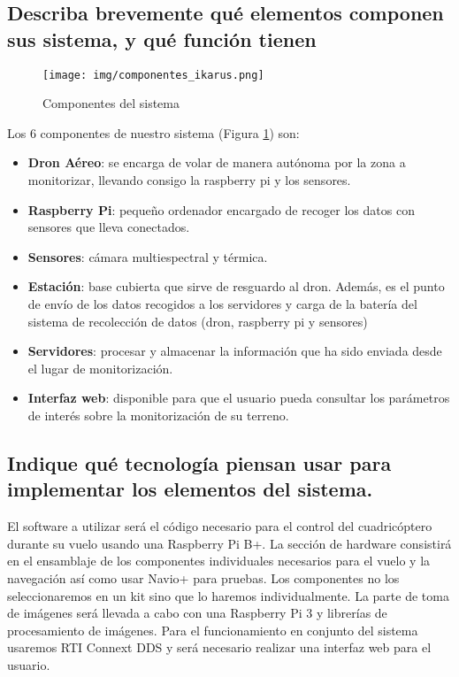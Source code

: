 \documentclass[11pt,spanish]{article} %
\begin{document}
\subsection{Describa brevemente qué elementos componen sus sistema, y qué función tienen}

\begin{figure}[H]
	\centering
	\texttt{[image: img/componentes\_ikarus.png]}
	\caption{Componentes del sistema}
	\label{fig:esquema_inicial}
\end{figure}

Los 6 componentes de nuestro sistema (Figura \ref{fig:esquema_inicial}) son:
\begin{itemize}
\item \textbf{Dron Aéreo}: se encarga de volar de manera autónoma por la zona a monitorizar, llevando consigo la raspberry pi y los sensores.

\item \textbf{Raspberry Pi}: pequeño ordenador encargado de recoger los datos con sensores que lleva conectados.

\item \textbf{Sensores}: cámara multiespectral y térmica. 

\item \textbf{Estación}: base cubierta que sirve de resguardo al dron. Además, es el punto de envío de los datos recogidos a los servidores y carga de la batería del sistema de recolección de datos (dron, raspberry pi  y sensores)

\item \textbf{Servidores}: procesar y almacenar la información que ha sido enviada desde el lugar de monitorización.

\item \textbf{Interfaz web}: disponible para que el usuario pueda consultar los parámetros de interés sobre la monitorización de su terreno.
\end{itemize}

\subsection{Indique qué tecnología piensan usar para implementar los elementos del sistema.}
El software a utilizar será el código necesario para el control del cuadricóptero durante su vuelo usando una Raspberry Pi B+. La sección de hardware consistirá en el ensamblaje de los componentes individuales necesarios para el vuelo y la navegación así como usar Navio+ para pruebas. Los componentes no los seleccionaremos en un kit sino que lo haremos individualmente. La parte de toma de imágenes será llevada a cabo con una Raspberry Pi 3 y librerías de procesamiento de imágenes. Para el funcionamiento en conjunto del sistema usaremos RTI Connext DDS y será necesario realizar una interfaz web para el usuario.



\end{document}
